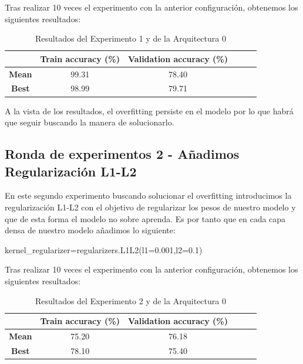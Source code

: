 \documentclass{article}
\begin{document}
			
			Tras realizar 10 veces el experimento con la anterior configuraci\'on, obtenemos los siguientes resultados:
			\begin{table}[!h]
				\begin{center}
					\begin{tabular}{ c | c | c | c | c | c |}
						\ & \textbf{Train accuracy (\%)} & \textbf{Validation accuracy (\%)}  \\ \hline
						\textbf{Mean} & 99.31 & 78.40 \\ \hline
						\textbf{Best} & 98.99 & 79.71 \\ \hline
					\end{tabular}
					\caption{Resultados del Experimento 1 y de la Arquitectura 0}
					\label{tab:res-j-a0-e1}
				\end{center}
			\end{table}
		    
		    A la vista de los resultados, el overfitting persiste en el modelo por lo que habr\'a que seguir buscando la manera de solucionarlo.

      \subsection{Ronda de experimentos 2 - A\~{n}adimos Regularizaci\'on L1-L2}
		\label{j-s-a0-e2} %
			En este segundo experimento buscando solucionar el overfitting introducimos la regularizaci\'on L1-L2 con el objetivo de regularizar los pesos de nuestro modelo y que de esta forma el modelo no sobre aprenda.
            Es por tanto que en cada capa densa de nuestro modelo a\~{n}adimos lo siguiente:
            
            kernel\_regularizer=regularizers.L1L2(l1=0.001,l2=0.1)
			
			
			Tras realizar 10 veces el experimento con la anterior configuraci\'on, obtenemos los siguientes resultados:
			\begin{table}[!h]
				\begin{center}
					\begin{tabular}{ c | c | c | c | c | c |}
						\ & \textbf{Train accuracy (\%)} & \textbf{Validation accuracy (\%)}  \\ \hline
						\textbf{Mean} & 75.20 & 76.18 \\ \hline
						\textbf{Best} & 78.10 & 75.40 \\ \hline
					\end{tabular}
					\caption{Resultados del Experimento 2 y de la Arquitectura 0}
					\label{tab:res-j-a0-e1}
				\end{center}
			\end{table}
		    
\end{document}
